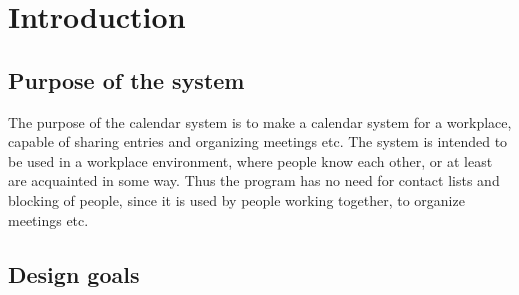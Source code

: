 \section{Introduction}
\subsection{Purpose of the system}
The purpose of the calendar system is to make a calendar system for a workplace, capable of sharing entries and organizing meetings etc.
The system is intended to be used in a workplace environment, where people know each other, or at least are acquainted in some way. Thus the program has no need for contact lists and blocking of people, since it is used by people working together, to organize meetings etc.
\subsection{Design goals}
